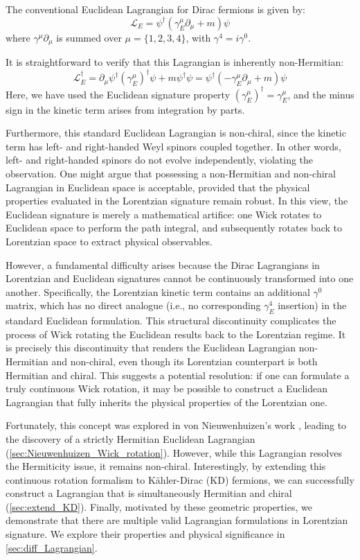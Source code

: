 The conventional Euclidean Lagrangian for Dirac fermions is given by: 
\[
\mathcal{L}_E=\psi^\dagger (\gamma_E^\mu\partial_\mu +m)\psi
\]
where $\gamma^\mu\partial_\mu$ is summed over $\mu=\{1,2,3,4\}$, with $\gamma^4=i\gamma^0$. 

It is straightforward to verify that this Lagrangian is inherently non-Hermitian: 
\[
\mathcal{L}_E^\dagger=\partial_\mu\psi^\dagger (\gamma_E^\mu)^\dagger \psi+m\psi^\dagger\psi=\psi^\dagger (-\gamma_E^\mu\partial_\mu +m)\psi
\]
Here, we have used the Euclidean signature property $(\gamma_E^\mu)^\dagger=\gamma_E^\mu$, and the minus sign in the kinetic term arises from integration by parts.

Furthermore, this standard Euclidean Lagrangian is non-chiral, since the kinetic term has left- and right-handed Weyl spinors coupled together. In other words, left- and right-handed spinors do not evolve independently, violating the observation. One might argue that possessing a non-Hermitian and non-chiral Lagrangian in Euclidean space is acceptable, provided that the physical properties evaluated in the Lorentzian signature remain robust. In this view, the Euclidean signature is merely a mathematical artifice: one Wick rotates to Euclidean space to perform the path integral, and subsequently rotates back to Lorentzian space to extract physical observables.

However, a fundamental difficulty arises because the Dirac Lagrangians in Lorentzian and Euclidean signatures cannot be continuously transformed into one another. Specifically, the Lorentzian kinetic term contains an additional $\gamma^0$ matrix, which has no direct analogue (i.e., no corresponding $\gamma_E^4$ insertion) in the standard Euclidean formulation. This structural discontinuity complicates the process of Wick rotating the Euclidean results back to the Lorentzian regime. It is precisely this discontinuity that renders the Euclidean Lagrangian non-Hermitian and non-chiral, even though its Lorentzian counterpart is both Hermitian and chiral. This suggests a potential resolution: if one can formulate a truly continuous Wick rotation, it may be possible to construct a Euclidean Lagrangian that fully inherits the physical properties of the Lorentzian one. 

Fortunately, this concept was explored in von Nieuwenhuizen's work \cite{VANNIEUWENHUIZEN199629}, leading to the discovery of a strictly Hermitian Euclidean Lagrangian (\cref{sec:Nieuwenhuizen_Wick_rotation}). However, while this Lagrangian resolves the Hermiticity issue, it remains non-chiral. Interestingly, by extending this continuous rotation formalism to Kähler-Dirac (KD) fermions, we can successfully construct a Lagrangian that is simultaneously Hermitian and chiral (\cref{sec:extend_KD}). Finally, motivated by these geometric properties, we demonstrate that there are multiple valid Lagrangian formulations in Lorentzian signature. We explore their properties and physical significance in \cref{sec:diff_Lagrangian}.

